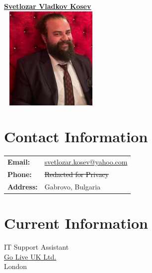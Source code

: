 \documentclass[letterpaper, 10pt]{article}
\begin{document}
	\pagestyle{empty} %
	
	\begin{center}
		\begin{minipage}[t]{0.5\textwidth}
			\centering
			\Large\textbf{\href{https://www.linkedin.com/in/svetlozar-kosev-m-sc-it-278058144/}{Svetlozar
					Vladkov Kosev}}\\[2ex]
			\includegraphics[width=5cm, height=5cm, keepaspectratio]{photo.jpg}
		\end{minipage}%
		\begin{minipage}[t]{0.5\textwidth}
			\section*{Contact Information}
			\begin{tabular}{@{}l l}
				\textbf{Email:}   & \href{mailto:svetlozar.kosev@yahoo.com}{svetlozar.kosev@yahoo.com} \\
				\textbf{Phone:} & \textcolor{black}{\st{Redacted for Privacy}} \\
				\textbf{Address:} & Gabrovo, Bulgaria                                                  \\
			\end{tabular}
			
			\section*{Current Information}
			IT Support Assistant \\ \href{https://www.goliveuk.com/}{Go Live UK Ltd.}
			\\ London \\
		\end{minipage}
	\end{center}
	
\end{document}
